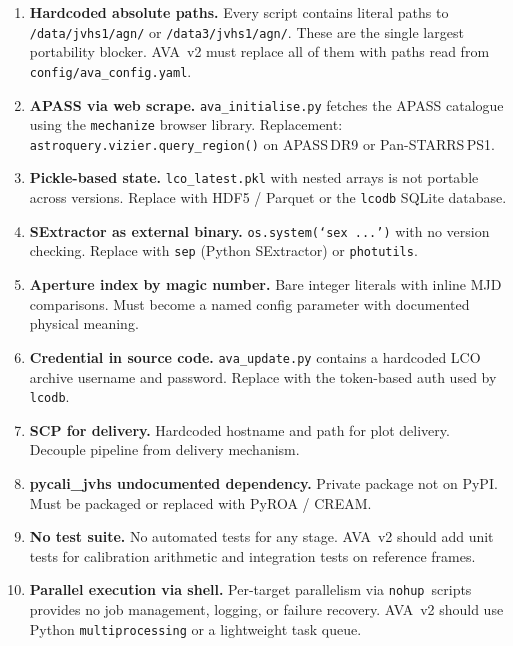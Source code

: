 \documentclass[12pt,a4paper]{article}
\begin{document}
\begin{enumerate}

\item \textbf{Hardcoded absolute paths.}  Every script contains literal paths to
      \texttt{/data/jvhs1/agn/} or \texttt{/data3/jvhs1/agn/}.  These are the single
      largest portability blocker.  AVA~v2 must replace all of them with paths read from
      \texttt{config/ava\_config.yaml}.

\item \textbf{APASS via web scrape.}  \texttt{ava\_initialise.py} fetches the APASS
      catalogue using the \texttt{mechanize} browser library.  Replacement:
      \texttt{astroquery.vizier.query\_region()} on APASS\,DR9 or Pan-STARRS\,PS1.

\item \textbf{Pickle-based state.}  \texttt{lco\_latest.pkl} with nested arrays is not
      portable across versions.  Replace with HDF5 / Parquet or the \texttt{lcodb}
      SQLite database.

\item \textbf{SExtractor as external binary.}  \texttt{os.system(`sex ...')} with no
      version checking.  Replace with \texttt{sep} (Python SExtractor) or
      \texttt{photutils}.

\item \textbf{Aperture index by magic number.}  Bare integer literals with inline MJD
      comparisons.  Must become a named config parameter with documented physical meaning.

\item \textbf{Credential in source code.}  \texttt{ava\_update.py} contains a hardcoded
      LCO archive username and password.  Replace with the token-based auth used by
      \texttt{lcodb}.

\item \textbf{SCP for delivery.}  Hardcoded hostname and path for plot delivery.
      Decouple pipeline from delivery mechanism.

\item \textbf{pycali\_jvhs undocumented dependency.}  Private package not on PyPI.
      Must be packaged or replaced with PyROA / CREAM.

\item \textbf{No test suite.}  No automated tests for any stage.  AVA~v2 should add
      unit tests for calibration arithmetic and integration tests on reference frames.

\item \textbf{Parallel execution via shell.}  Per-target parallelism via
      \texttt{nohup}~scripts provides no job management, logging, or failure recovery.
      AVA~v2 should use Python \texttt{multiprocessing} or a lightweight task queue.

\end{enumerate}
\end{document}
